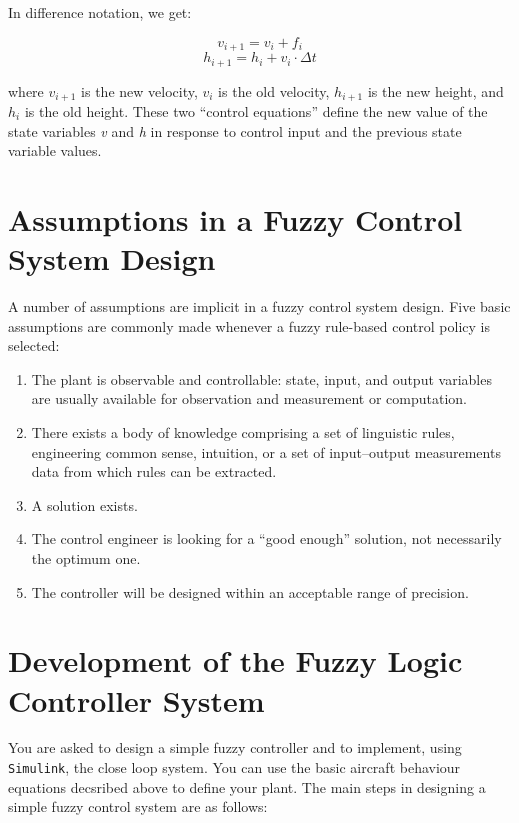 \documentclass{article}
\begin{document}
\noindent
In difference notation, we get:

$$v_{i+1} = v_i + f_i$$
$$h_{i+1} = h_i + v_i \cdot \Delta t$$

where $v_{i+1}$ is the new velocity, $v_i$ is the old velocity,
$h_{i+1}$ is the new height, and $h_i$ is the old height. These two
“control equations” define the new value of the state variables {\em
  v} and {\em h} in response to control input and the previous state
variable values.

\section{Assumptions in a Fuzzy Control System Design}

A number of assumptions are implicit in a fuzzy control system design. Five basic assumptions
are commonly made whenever a fuzzy rule-based control policy is selected:

\begin{enumerate}
\item The plant is observable and controllable: state, input, and output variables are usually
available for observation and measurement or computation.
\item There exists a body of knowledge comprising a set of linguistic rules, engineering
common sense, intuition, or a set of input--output measurements data from which
rules can be extracted.
\item A solution exists.
\item The control engineer is looking for a “good enough” solution, not necessarily the
optimum one.
\item The controller will be designed within an acceptable range of precision.

\end{enumerate}


\section{Development of the Fuzzy Logic Controller System}

You are asked to design a simple fuzzy controller and to implement, using \texttt{Simulink}, the close loop system. You can use the 
basic aircraft behaviour equations decsribed above to define your plant. The main steps in designing a simple fuzzy control system are as follows:
\end{document}
